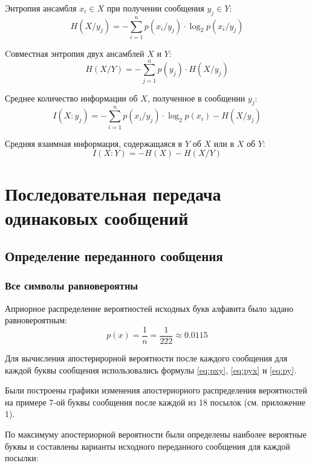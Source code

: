 Энтропия ансамбля $x_i \in X$ при получении сообщения $y_j \in Y$:
\begin{equation}\label{eq:hxyj}
	H(X/y_j) = - \sum_{i=1}^n p(x_i/y_j)\cdot \log_2 p(x_i/y_j)
\end{equation}

Cовместная энтропия двух ансамблей $X$ и $Y$: 
\begin{equation}\label{eq:hxy}
	H(X/Y) = - \sum_{j=1}^n p(y_j)\cdot H(X/y_j)
\end{equation}

Среднее количество информации об $X$, полученное в сообщении $y_j$:
\begin{equation}\label{eq:ixyj}
	I(X:y_j) = - \sum_{i=1}^n p(x_i/y_j)\cdot \log_2 p(x_i) - H(X/y_j)
\end{equation}

Средняя взаимная информация, содержащаяся в $Y$ об $X$ или в $X$ об $Y$: 
\begin{equation}\label{eq:ixy}
	I(X:Y) = - H(X) - H(X/Y)
\end{equation}

\section{Последовательная передача одинаковых сообщений}

\subsection{Определение переданного сообщения}

\subsubsection{Все символы равновероятны}\label{sec:uniform}

Априорное распределение вероятностей исходных букв алфавита было задано равновероятным:
\begin{equation}
	p(x) = \frac{1}{n} = \frac{1}{222} \approx 0.0115
\end{equation}

Для вычисления апостерирорной вероятности после каждого сообщения для каждой буквы сообщения использовались формулы \ref{eq:pxy}, \ref{eq:pyx} и \ref{eq:py}.

Были построены графики изменения апостериорного распределения вероятностей на примере 7-ой буквы сообщения после каждой из 18 посылок (см. приложение 1).

По максимуму апостериорной вероятности были определены наиболее вероятные буквы и составлены варианты исходного переданного сообщения для каждой посылки:

